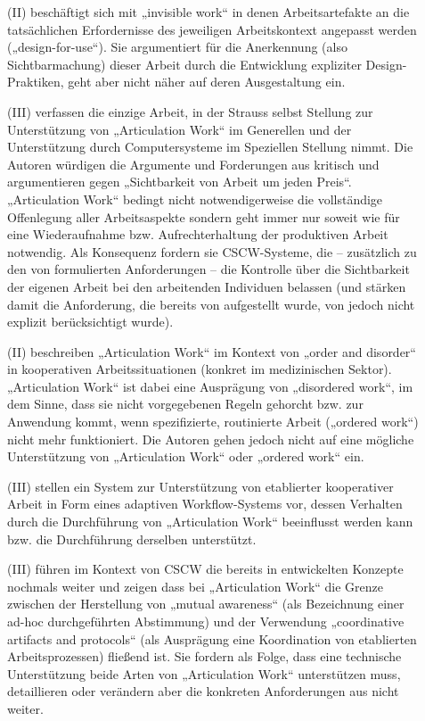 \begin{description}
	\item[\citet{Suchman99}] (II) beschäftigt sich mit „invisible work“ in denen Arbeitsartefakte an die tatsächlichen Erfordernisse des jeweiligen Arbeitskontext angepasst werden („design-for-use“). Sie argumentiert für die Anerkennung (also Sichtbarmachung) dieser Arbeit durch die Entwicklung expliziter Design-Praktiken, geht aber nicht näher auf deren Ausgestaltung ein.
	\item[\citet{Star99}] (III) verfassen die einzige Arbeit, in der Strauss selbst Stellung zur Unterstützung von „Articulation Work“ im Generellen und der Unterstützung durch Computersysteme im Speziellen Stellung nimmt. Die Autoren  würdigen die Argumente und Forderungen aus \citep{Schmidt96} kritisch und argumentieren gegen „Sichtbarkeit von Arbeit um jeden Preis“. „Articulation Work“ bedingt nicht notwendigerweise die vollständige Offenlegung aller Arbeitsaspekte sondern geht immer nur soweit wie für eine Wiederaufnahme bzw. Aufrechterhaltung der produktiven Arbeit notwendig. Als Konsequenz fordern sie \gls{CSCW}-Systeme, die -- zusätzlich zu den von \citet{Schmidt96} formulierten Anforderungen -- die Kontrolle über die Sichtbarkeit der eigenen Arbeit bei den arbeitenden Individuen belassen (und stärken damit die Anforderung, die bereits von \citet{Schmidt92} aufgestellt wurde, von \citet{Schmidt96} jedoch nicht explizit berücksichtigt wurde).
	\item[\citet{Berg00}] (II) beschreiben „Articulation Work“ im Kontext von „order and disorder“ in kooperativen Arbeitssituationen (konkret im medizinischen Sektor). „Articulation Work“ ist dabei eine Ausprägung von „disordered work“, im dem Sinne, dass sie nicht vorgegebenen Regeln gehorcht bzw. zur Anwendung kommt, wenn spezifizierte, routinierte Arbeit („ordered work“) nicht mehr funktioniert. Die Autoren gehen jedoch nicht auf eine mögliche Unterstützung von „Articulation Work“ oder „ordered work“ ein.
	\item[\citet{Divitini00}] (III) stellen ein System zur Unterstützung von etablierter kooperativer Arbeit in Form eines adaptiven Workflow-Systems vor, dessen Verhalten durch die Durchführung von „Articulation Work“ beeinflusst werden kann bzw. die Durchführung derselben unterstützt.
	\item[\citet{Schmidt00}] (III) führen im Kontext von CSCW die bereits in \citep{Schmidt96} entwickelten Konzepte nochmals weiter und zeigen dass bei „Articulation Work“ die Grenze zwischen der Herstellung von „mutual awareness“ (als Bezeichnung einer ad-hoc durchgeführten Abstimmung) und der Verwendung „coordinative artifacts and protocols“ (als Ausprägung eine Koordination von etablierten Arbeitsprozessen) fließend ist. Sie fordern als Folge, dass eine technische Unterstützung beide Arten von „Articulation Work“ unterstützen muss, detaillieren oder verändern aber die konkreten Anforderungen aus \citep{Schmidt96} nicht weiter.

\end{description}
